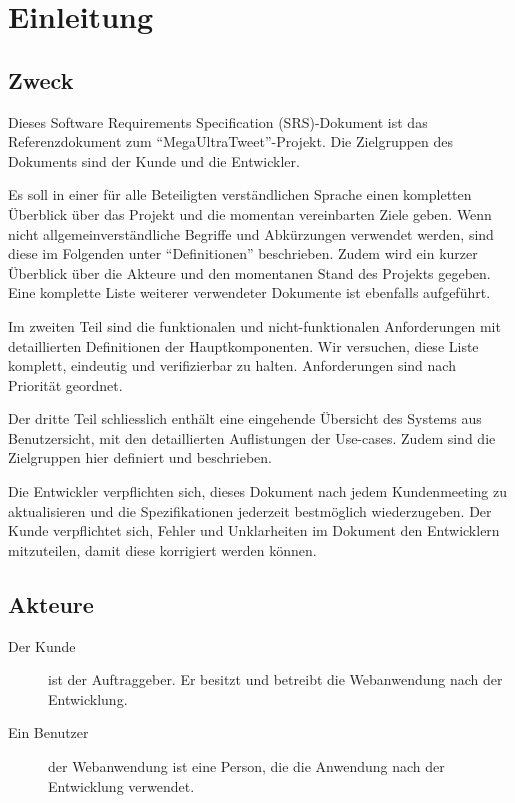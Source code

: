 \documentclass[a4wide]{article}
\title{}
\author{}
\begin{document}

\tableofcontents
\clearpage
\section{Einleitung}
\subsection{Zweck}
Dieses Software Requirements Specification (SRS)-Dokument ist das Referenzdokument zum \enquote{MegaUltraTweet}-Projekt. Die Zielgruppen des Dokuments sind der Kunde und die Entwickler.

Es soll in einer für alle Beteiligten verständlichen Sprache einen kompletten \"Uberblick \"uber das Projekt und die momentan vereinbarten Ziele geben. Wenn nicht allgemeinverständliche Begriffe und Abk\"urzungen verwendet werden, sind diese im Folgenden unter \enquote{Definitionen} beschrieben. Zudem wird ein kurzer \"Uberblick \"uber die Akteure und den momentanen Stand des Projekts gegeben. Eine komplette Liste weiterer verwendeter Dokumente ist ebenfalls aufgef\"uhrt.

Im zweiten Teil sind die funktionalen und nicht-funktionalen Anforderungen mit detaillierten Definitionen der Hauptkomponenten. Wir versuchen, diese Liste komplett, eindeutig und verifizierbar zu halten. Anforderungen sind nach Priorität geordnet.

Der dritte Teil schliesslich enth\"alt eine eingehende \"Ubersicht des Systems aus Benutzersicht, mit den detaillierten Auflistungen der Use-cases. Zudem sind die Zielgruppen hier definiert und beschrieben.

Die Entwickler verpflichten sich, dieses Dokument nach jedem Kundenmeeting zu aktualisieren und die Spezifikationen jederzeit bestmöglich wiederzugeben. Der Kunde verpflichtet sich, Fehler und Unklarheiten im Dokument den Entwicklern mitzuteilen, damit diese korrigiert werden können.

\subsection{Akteure}
\begin{description}
\item[Der Kunde] ist der Auftraggeber. Er besitzt und betreibt die Webanwendung nach der Entwicklung.
\item[Ein Benutzer] der Webanwendung ist eine Person, die die Anwendung nach der Entwicklung verwendet.
\end{description}
\end{document}
